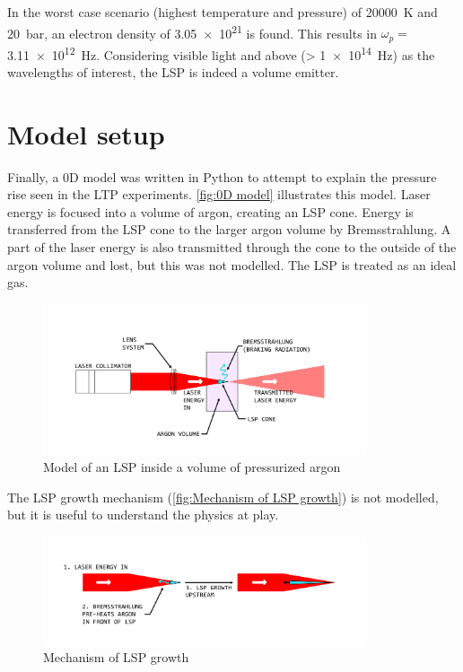         In the worst case scenario (highest temperature and pressure) of \qty{20000}{K} and \qty{20}{bar}, an electron density of \num{3.05e21} is found. This results in $\omega_p =$ \qty{3.11e12}{Hz}. Considering visible light and above (> \qty{1e14}{Hz}) as the wavelengths of interest, the LSP is indeed a volume emitter.

    \section{Model setup}
        
        Finally, a 0D model was written in Python to attempt to explain the pressure rise seen in the LTP experiments. \autoref{fig:0D model} illustrates this model. Laser energy is focused into a volume of argon, creating an LSP cone. Energy is transferred from the LSP cone to the larger argon volume by Bremsstrahlung. A part of the laser energy is also transmitted through the cone to the outside of the argon volume and lost, but this was not modelled. The LSP is treated as an ideal gas.

        \begin{figure}[!ht]
            \centering
            \includegraphics[width=0.85\textwidth]{assets/2 models/Modeling figure.pdf}
            \caption{Model of an LSP inside a volume of pressurized argon}
            \label{fig:0D model}
        \end{figure}

        The LSP growth mechanism (\autoref{fig:Mechanism of LSP growth}) is not modelled, but it is useful to understand the physics at play.

        \begin{figure}[!ht]
            \centering
            \includegraphics[width=0.85\textwidth]{assets/2 models/Mechanism of LSP growth.pdf}
            \caption{Mechanism of LSP growth}
            \label{fig:Mechanism of LSP growth}
        \end{figure}

